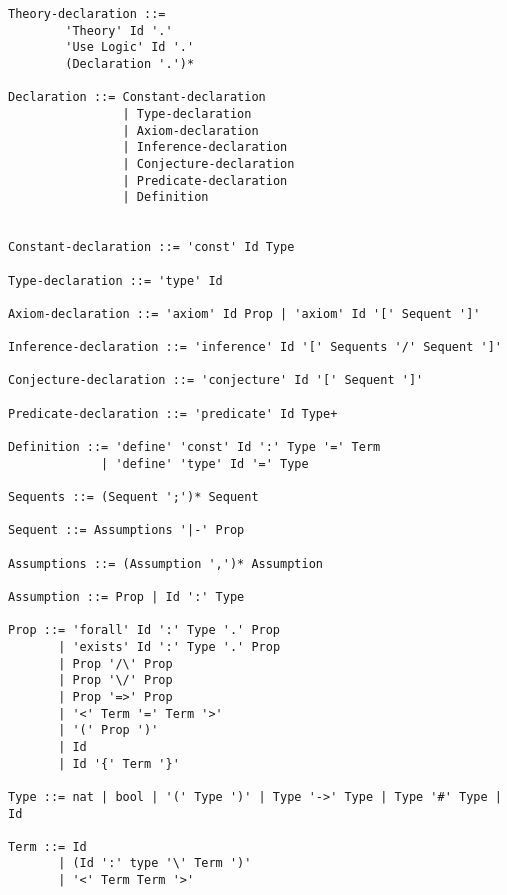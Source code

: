 \begin{verbatim}
Theory-declaration ::= 
        'Theory' Id '.'
        'Use Logic' Id '.'
        (Declaration '.')*

Declaration ::= Constant-declaration
                | Type-declaration
                | Axiom-declaration
                | Inference-declaration
                | Conjecture-declaration
                | Predicate-declaration
                | Definition


Constant-declaration ::= 'const' Id Type

Type-declaration ::= 'type' Id

Axiom-declaration ::= 'axiom' Id Prop | 'axiom' Id '[' Sequent ']' 

Inference-declaration ::= 'inference' Id '[' Sequents '/' Sequent ']'

Conjecture-declaration ::= 'conjecture' Id '[' Sequent ']'

Predicate-declaration ::= 'predicate' Id Type+

Definition ::= 'define' 'const' Id ':' Type '=' Term
             | 'define' 'type' Id '=' Type

Sequents ::= (Sequent ';')* Sequent

Sequent ::= Assumptions '|-' Prop

Assumptions ::= (Assumption ',')* Assumption

Assumption ::= Prop | Id ':' Type

Prop ::= 'forall' Id ':' Type '.' Prop
       | 'exists' Id ':' Type '.' Prop
       | Prop '/\' Prop
       | Prop '\/' Prop
       | Prop '=>' Prop
       | '<' Term '=' Term '>'
       | '(' Prop ')'
       | Id
       | Id '{' Term '}'

Type ::= nat | bool | '(' Type ')' | Type '->' Type | Type '#' Type | Id

Term ::= Id
       | (Id ':' type '\' Term ')'
       | '<' Term Term '>'
\end{verbatim}

